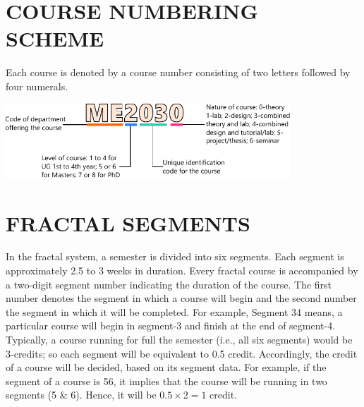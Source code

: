 \section{COURSE NUMBERING SCHEME}
Each course is denoted by a course number consisting of two letters followed by four numerals.
\begin{center}
    \includegraphics[width=0.8\textwidth, angle=0]{./parts/code-explain.pdf}
\end{center}


\section{FRACTAL SEGMENTS}
In the fractal system, a semester is divided into six segments. Each segment is approximately 2.5 to 3 weeks in duration. Every fractal course is accompanied by a two-digit segment number indicating the duration of the course. The first number denotes the segment in which a course will begin and the second number the segment in which it will be completed. For example, Segment 34 means, a particular course will begin in segment-3 and finish at the end of segment-4. Typically, a course running for full the semester (i.e., all six segments) would be 3-credits; so each segment will be equivalent to 0.5 credit. Accordingly, the credit of a course will be decided, based on its segment data. For example, if the segment of a course is 56, it implies that the course will be running in two segments (5 \& 6). Hence, it will be $0.5 \times 2 = 1$ credit. 

